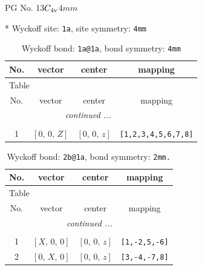 \documentclass[fleqn,8pt]{jsarticle}
\begin{document}
\setcounter{MaxMatrixCols}{32}

\renewcommand{\tablename}{Table~}
\renewcommand{\figurename}{Figure~}
\begin{center}
\LARGE
PG No. 13\quad$C_{\rm 4v}$\quad$4mm$\quad[ tetragonal ]
\end{center}


* Wyckoff site: {\tt 1a}, site symmetry: {\tt 4mm}
\renewcommand{\arraystretch}{1.2}
\begin{longtable}{cccc}
\caption{Wyckoff bond: {\tt 1a@1a}, bond symmetry: {\tt 4mm}}
 \\
 \hline \hline
No. & vector & center & mapping \\ \hline \endfirsthead

\multicolumn{3}{l}{\tablename\ \thetable{}} \\
 \hline \hline
No. & vector & center & mapping \\ \hline \endhead

 \hline \hline
\multicolumn{3}{r}{\footnotesize\it continued ...} \\ \endfoot

 \hline \hline
\multicolumn{3}{r}{} \\ \endlastfoot

1 & $\left[ 0,\, 0,\, Z \right]$ & $\left[ 0,\, 0,\, z \right]$ & {\tt [1,2,3,4,5,6,7,8]} \\
\end{longtable}
\renewcommand{\arraystretch}{1.2}
\begin{longtable}{cccc}
\caption{Wyckoff bond: {\tt 2b@1a}, bond symmetry: {\tt 2mm.}}
 \\
 \hline \hline
No. & vector & center & mapping \\ \hline \endfirsthead

\multicolumn{3}{l}{\tablename\ \thetable{}} \\
 \hline \hline
No. & vector & center & mapping \\ \hline \endhead

 \hline \hline
\multicolumn{3}{r}{\footnotesize\it continued ...} \\ \endfoot

 \hline \hline
\multicolumn{3}{r}{} \\ \endlastfoot

1 & $\left[ X,\, 0,\, 0 \right]$ & $\left[ 0,\, 0,\, z \right]$ & {\tt [1,-2,5,-6]} \\ \hline
2 & $\left[ 0,\, X,\, 0 \right]$ & $\left[ 0,\, 0,\, z \right]$ & {\tt [3,-4,-7,8]} \\
\end{longtable}
\end{document}
